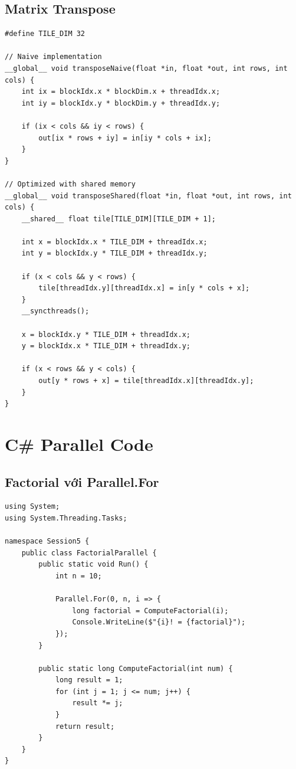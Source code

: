 \subsection{Matrix Transpose}

\begin{lstlisting}[caption={Matrix Transpose với Shared Memory}]
#define TILE_DIM 32

// Naive implementation
__global__ void transposeNaive(float *in, float *out, int rows, int cols) {
    int ix = blockIdx.x * blockDim.x + threadIdx.x;
    int iy = blockIdx.y * blockDim.y + threadIdx.y;
    
    if (ix < cols && iy < rows) {
        out[ix * rows + iy] = in[iy * cols + ix];
    }
}

// Optimized with shared memory
__global__ void transposeShared(float *in, float *out, int rows, int cols) {
    __shared__ float tile[TILE_DIM][TILE_DIM + 1];
    
    int x = blockIdx.x * TILE_DIM + threadIdx.x;
    int y = blockIdx.y * TILE_DIM + threadIdx.y;
    
    if (x < cols && y < rows) {
        tile[threadIdx.y][threadIdx.x] = in[y * cols + x];
    }
    __syncthreads();
    
    x = blockIdx.y * TILE_DIM + threadIdx.x;
    y = blockIdx.x * TILE_DIM + threadIdx.y;
    
    if (x < rows && y < cols) {
        out[y * rows + x] = tile[threadIdx.x][threadIdx.y];
    }
}
\end{lstlisting}

\section{C\# Parallel Code}

\subsection{Factorial với Parallel.For}

\begin{lstlisting}[style=csharpstyle, caption={FactorialParallel.cs}]
using System;
using System.Threading.Tasks;

namespace Session5 {
    public class FactorialParallel {
        public static void Run() {
            int n = 10;
            
            Parallel.For(0, n, i => {
                long factorial = ComputeFactorial(i);
                Console.WriteLine($"{i}! = {factorial}");
            });
        }
        
        public static long ComputeFactorial(int num) {
            long result = 1;
            for (int j = 1; j <= num; j++) {
                result *= j;
            }
            return result;
        }
    }
}
\end{lstlisting}

